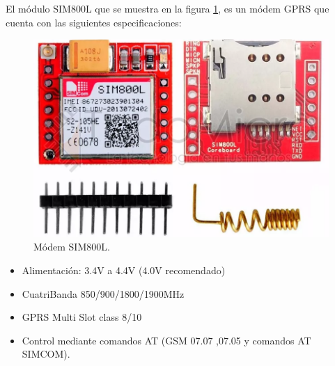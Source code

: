 El módulo SIM800L que se muestra en la figura \ref{fig:sim800l}, es un módem GPRS que cuenta con las siguientes especificaciones:

\begin{figure}[!htb]
  \centering
  \includegraphics[scale=0.2]{./Figures/sim800.png}
  \caption{Módem SIM800L.}
  \label{fig:sim800l}
\end{figure}

\begin{itemize}
  \item Alimentación: 3.4V a 4.4V (4.0V recomendado)
  \item  CuatriBanda 850/900/1800/1900MHz
  \item  GPRS Multi Slot class 8/10
  \item  Control mediante comandos AT (GSM 07.07 ,07.05 y comandos AT SIMCOM).
\end{itemize}


